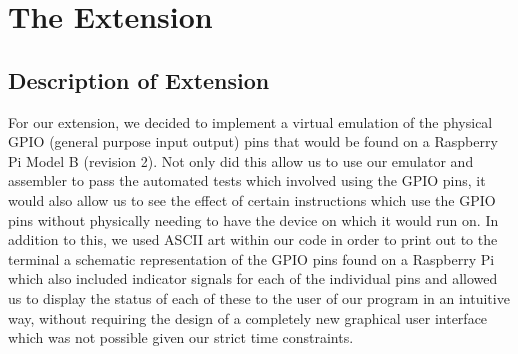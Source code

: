 \documentclass[11pt]{article}
\begin{document}
\section{The Extension}
\subsection{Description of Extension}
For our extension, we decided to implement a virtual emulation of the physical GPIO (general purpose input output) pins that would be found on a Raspberry Pi Model B (revision 2). Not only did this allow us to use our emulator and assembler to pass the automated tests which involved using the GPIO pins, it would also allow us to see the effect of certain instructions which use the GPIO pins without physically needing to have the device on which it would run on. In addition to this, we used ASCII art within our code in order to print out to the terminal a schematic representation of the GPIO pins found on a Raspberry Pi which also included indicator signals for each of the individual pins and allowed us to display the status of each of these to the user of our program in an intuitive way, without requiring the design of a completely new graphical user interface which was not possible given our strict time constraints.
\end{document}
